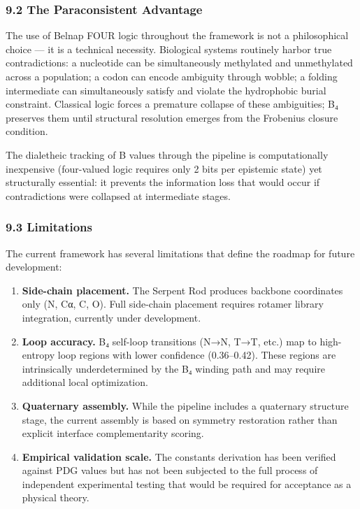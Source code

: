 \documentclass[12pt,a4paper]{article}
\begin{document}
\hypertarget{the-paraconsistent-advantage}{%
\subsubsection{9.2 The Paraconsistent
Advantage}\label{the-paraconsistent-advantage}}

The use of Belnap FOUR logic throughout the framework is not a
philosophical choice --- it is a technical necessity. Biological systems
routinely harbor true contradictions: a nucleotide can be simultaneously
methylated and unmethylated across a population; a codon can encode
ambiguity through wobble; a folding intermediate can simultaneously
satisfy and violate the hydrophobic burial constraint. Classical logic
forces a premature collapse of these ambiguities; B₄ preserves them
until structural resolution emerges from the Frobenius closure
condition.

The dialetheic tracking of B values through the pipeline is
computationally inexpensive (four-valued logic requires only 2 bits per
epistemic state) yet structurally essential: it prevents the information
loss that would occur if contradictions were collapsed at intermediate
stages.

\hypertarget{limitations}{%
\subsubsection{9.3 Limitations}\label{limitations}}

The current framework has several limitations that define the roadmap
for future development:

\begin{enumerate}
\def\labelenumi{\arabic{enumi}.}
\item
  \textbf{Side-chain placement.} The Serpent Rod produces backbone
  coordinates only (N, Cα, C, O). Full side-chain placement requires
  rotamer library integration, currently under development.
\item
  \textbf{Loop accuracy.} B₄ self-loop transitions (N→N, T→T, etc.) map
  to high-entropy loop regions with lower confidence (0.36--0.42). These
  regions are intrinsically underdetermined by the B₄ winding path and
  may require additional local optimization.
\item
  \textbf{Quaternary assembly.} While the pipeline includes a quaternary
  structure stage, the current assembly is based on symmetry restoration
  rather than explicit interface complementarity scoring.
\item
  \textbf{Empirical validation scale.} The constants derivation has been
  verified against PDG values but has not been subjected to the full
  process of independent experimental testing that would be required for
  acceptance as a physical theory.
\end{enumerate}
\end{document}
